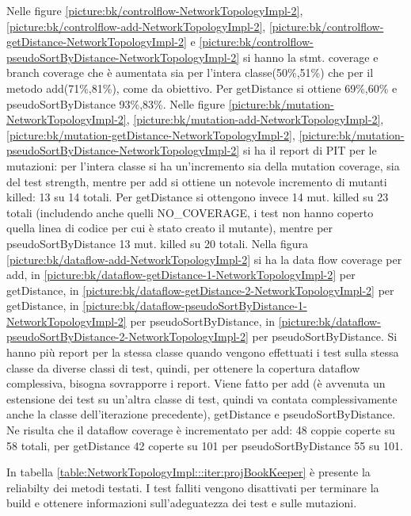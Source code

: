 \documentclass[10pt, a4paper]{article}
\newcommand{\gettablelabel}[5]{table:#1:#2:#3:iter#4:proj#5}
\newcommand{\getreltablelabel}[2]{\gettablelabel{#1}{}{}{}{#2}}
\newcommand{\getpicturelabel}[1]{picture:#1}
\def\bookkeeper{BookKeeper}
\begin{document}
	Nelle figure \ref{\getpicturelabel{bk/controlflow-NetworkTopologyImpl-2}}, \ref{\getpicturelabel{bk/controlflow-add-NetworkTopologyImpl-2}}, \ref{\getpicturelabel{bk/controlflow-getDistance-NetworkTopologyImpl-2}} e \ref{\getpicturelabel{bk/controlflow-pseudoSortByDistance-NetworkTopologyImpl-2}} si hanno la stmt. coverage e branch coverage che è aumentata sia per l'intera classe(50\%,51\%) che per il metodo add(71\%,81\%), come da obiettivo.
	Per getDistance si ottiene 69\%,60\% e pseudoSortByDistance 93\%,83\%.
	Nelle figure \ref{\getpicturelabel{bk/mutation-NetworkTopologyImpl-2}}, 
	\ref{\getpicturelabel{bk/mutation-add-NetworkTopologyImpl-2}},
	\ref{\getpicturelabel{bk/mutation-getDistance-NetworkTopologyImpl-2}},
	\ref{\getpicturelabel{bk/mutation-pseudoSortByDistance-NetworkTopologyImpl-2}} si ha il report di PIT per
	le mutazioni: per l'intera classe si ha un'incremento sia della mutation coverage, sia del test strength,
	mentre per add si ottiene un notevole incremento di mutanti killed: 13 su 14 totali.
	Per getDistance si ottengono invece 14 mut. killed su 23 totali (includendo anche quelli
	NO\_COVERAGE, i test non hanno coperto quella linea di codice per cui è stato creato il mutante), mentre per
	pseudoSortByDistance 13 mut. killed su 20 totali.
	Nella figura \ref{\getpicturelabel{bk/dataflow-add-NetworkTopologyImpl-2}} si ha la data flow coverage per add,
	in \ref{\getpicturelabel{bk/dataflow-getDistance-1-NetworkTopologyImpl-2}} per getDistance,
	in \ref{\getpicturelabel{bk/dataflow-getDistance-2-NetworkTopologyImpl-2}} per getDistance,
	in \ref{\getpicturelabel{bk/dataflow-pseudoSortByDistance-1-NetworkTopologyImpl-2}} per pseudoSortByDistance,
	in \ref{\getpicturelabel{bk/dataflow-pseudoSortByDistance-2-NetworkTopologyImpl-2}} per pseudoSortByDistance.
	Si hanno più report per la stessa classe quando vengono effettuati i test sulla stessa classe da diverse classi
	di test, quindi, per ottenere la copertura dataflow complessiva, bisogna sovrapporre i report. Viene fatto 
	per add (è avvenuta un estensione dei test su un'altra classe di test, quindi va contata complessivamente anche
	la classe dell'iterazione precedente), getDistance e pseudoSortByDistance.
	Ne risulta che il dataflow coverage è incrementato per add: 48 coppie coperte su 58 totali, per
	getDistance 42 coperte su 101 per pseudoSortByDistance 55 su 101.
	
	In tabella \ref{\getreltablelabel{NetworkTopologyImpl}{\bookkeeper}} è
	presente la reliabilty dei metodi testati. I test falliti vengono disattivati
	per terminare la build e ottenere informazioni sull'adeguatezza dei test e
	sulle mutazioni.
\end{document}
